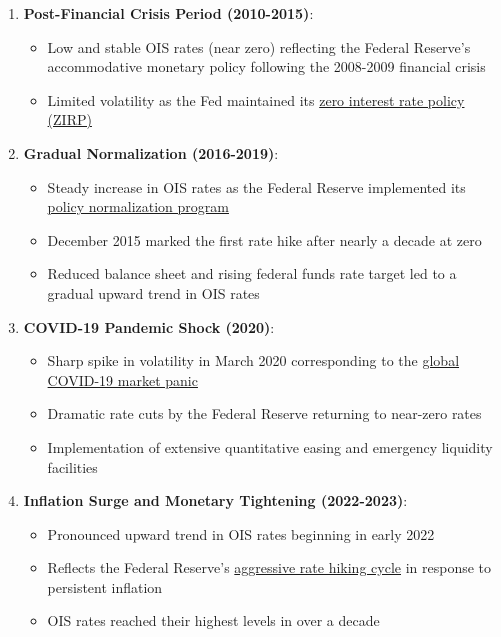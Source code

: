 \documentclass{article}
\begin{document}
\begin{enumerate}
  \item \textbf{Post-Financial Crisis Period (2010-2015)}:
  \begin{itemize}
    \item Low and stable OIS rates (near zero) reflecting the Federal Reserve's accommodative monetary policy following the 2008-2009 financial crisis
    \item Limited volatility as the Fed maintained its \href{https://www.federalreserve.gov/monetarypolicy/review-of-monetary-policy-strategy-tools-and-communications-fed-listens-events.htm}{zero interest rate policy (ZIRP)}
  \end{itemize}

  \item \textbf{Gradual Normalization (2016-2019)}:
  \begin{itemize}
    \item Steady increase in OIS rates as the Federal Reserve implemented its \href{https://www.federalreserve.gov/monetarypolicy/policy-normalization.htm}{policy normalization program}
    \item December 2015 marked the first rate hike after nearly a decade at zero
    \item Reduced balance sheet and rising federal funds rate target led to a gradual upward trend in OIS rates
  \end{itemize}

  \item \textbf{COVID-19 Pandemic Shock (2020)}:
  \begin{itemize}
    \item Sharp spike in volatility in March 2020 corresponding to the \href{https://www.federalreserve.gov/newsevents/pressreleases/monetary20200315a.htm}{global COVID-19 market panic}
    \item Dramatic rate cuts by the Federal Reserve returning to near-zero rates
    \item Implementation of extensive quantitative easing and emergency liquidity facilities
  \end{itemize}

  \item \textbf{Inflation Surge and Monetary Tightening (2022-2023)}:
  \begin{itemize}
    \item Pronounced upward trend in OIS rates beginning in early 2022
    \item Reflects the Federal Reserve's \href{https://www.federalreserve.gov/monetarypolicy/fomccalendars.htm}{aggressive rate hiking cycle} in response to persistent inflation
    \item OIS rates reached their highest levels in over a decade
  \end{itemize}


\end{enumerate}
\end{document}
